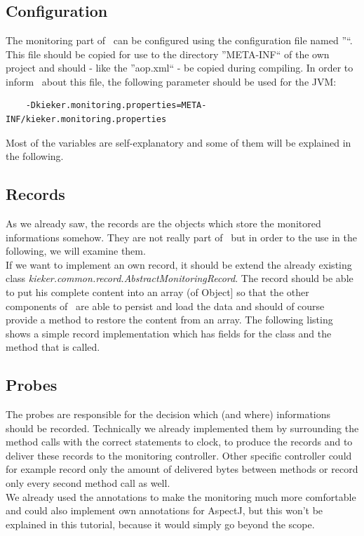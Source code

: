 \documentclass[a4paper, oneside, 11pt]{scrartcl}
\begin{document}
  \section{\KiekerMonitoring}
    \subsection{Configuration}
      The monitoring part of \Kieker\ can be configured using the configuration file named ''\monitoringPropertiesFile``. This file should be copied for use to the directory ''META-INF`` of the own project and should - like the ''aop.xml`` - be copied during compiling. In order to inform \Kieker\ about this file, the following parameter should be used for the JVM:
      \begin{lstlisting}
	-Dkieker.monitoring.properties=META-INF/kieker.monitoring.properties
      \end{lstlisting}
      Most of the variables are self-explanatory and some of them will be explained in the following.

    \subsection{Records}
      As we already saw, the records are the objects which store the monitored informations somehow. They are not really part of \KiekerMonitoring\ but in order to the use in the following, we will examine them.\\
      If we want to implement an own record, it should be extend the already existing class \textit{kieker.common.record.AbstractMonitoringRecord}. The record should be able to put his complete content into an array (of Object] so that the other components of \Kieker\ are able to persist and load the data and should of course provide a method to restore the content from an array. The following listing shows a simple record implementation which has fields for the class and the method that is called.
      \setJavaCodeListing
      \lstset{caption=MyRecord.java}
      

    \subsection{Probes}
      The probes are responsible for the decision which (and where) informations should be recorded. Technically we already implemented them by surrounding the method calls with the correct statements to clock, to produce the records and to deliver these records to the monitoring controller. Other specific controller could for example record only the amount of delivered bytes between methods or record only every second method call as well.\\
      We already used the annotations to make the monitoring much more comfortable and could also implement own annotations for AspectJ, but this won't be explained in this tutorial, because it would simply go beyond the scope.
\end{document}
